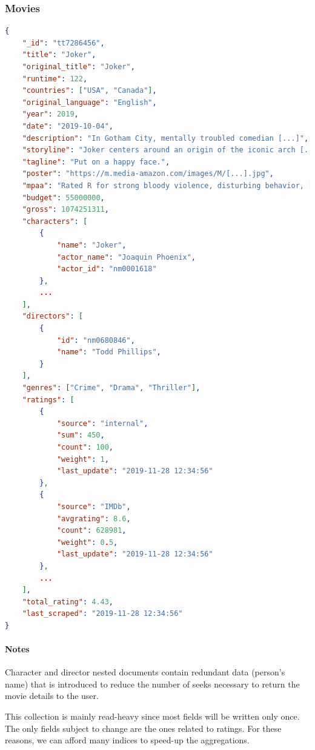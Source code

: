 \documentclass[11pt]{article}
\begin{document}
\subsubsection{Movies}
\label{sec:movies}

\begin{lstlisting}[language=json]	
{
	"_id": "tt7286456",
	"title": "Joker",
	"original_title": "Joker",
	"runtime": 122,
	"countries": ["USA", "Canada"],
	"original_language": "English",
	"year": 2019,
	"date": "2019-10-04",
	"description": "In Gotham City, mentally troubled comedian [...]",
	"storyline": "Joker centers around an origin of the iconic arch [...]",
	"tagline": "Put on a happy face.",
	"poster": "https://m.media-amazon.com/images/M/[...].jpg",
	"mpaa": "Rated R for strong bloody violence, disturbing behavior, [...]",
	"budget": 55000000,
	"gross": 1074251311, 
	"characters": [
		{
			"name": "Joker",
			"actor_name": "Joaquin Phoenix",
			"actor_id": "nm0001618"
		},
		...
	],
	"directors": [
		{
			"id": "nm0680846",
			"name": "Todd Phillips",
		}
	],
	"genres": ["Crime", "Drama", "Thriller"],
	"ratings": [
		{
			"source": "internal",
			"sum": 450,
			"count": 100,
			"weight": 1,
			"last_update": "2019-11-28 12:34:56"
		},
		{
			"source": "IMDb",
			"avgrating": 8.6,
			"count": 628981,
			"weight": 0.5,
			"last_update": "2019-11-28 12:34:56"
		},
		...
	],
	"total_rating": 4.43,
	"last_scraped": "2019-11-28 12:34:56"
}
\end{lstlisting}

\paragraph{Notes}
Character and director nested documents contain redundant data (person's name) that is introduced to reduce the number of seeks necessary to return the movie details
to the user.

This collection is mainly read-heavy since most fields will be written only once.
The only fields subject to change are the ones related to ratings. For these reasons,
we can afford many indices to speed-up the aggregations.
\end{document}
